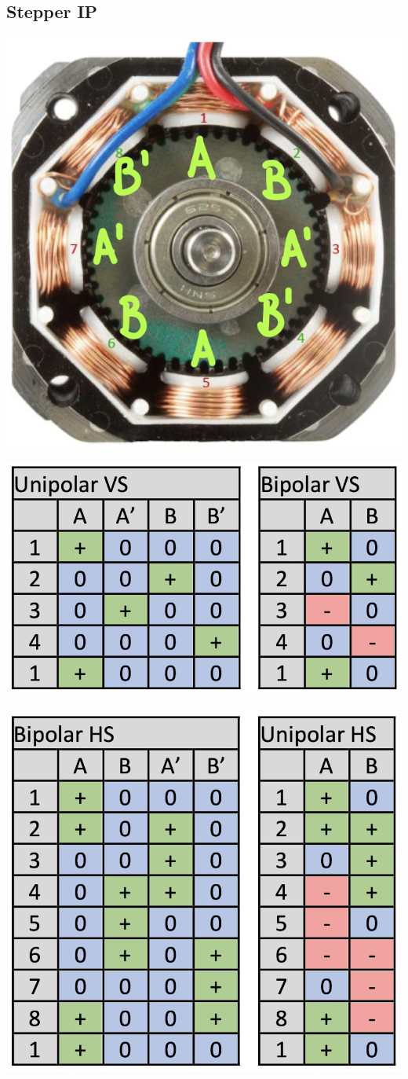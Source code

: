 \subsection{Stepper \hfill IP}
\begin{footnotesize}
    \begin{center}
        \begin{minipage}{0.4\linewidth}
            \includegraphics[width = 0.6\linewidth]{MAEIP_Stepper}
        \end{minipage}
        \begin{minipage}{0.58\linewidth}
            \includegraphics[width = 0.8\linewidth]{MAEIP_Stepper_Tab1}
        \end{minipage}
        \begin{minipage}{0.4\linewidth}
            \includegraphics[width = 0.8\linewidth]{MAEIP_Stepper_Tab2}

\end{minipage}
\end{center}
\end{footnotesize}
